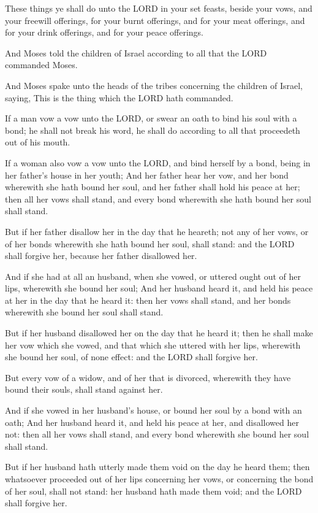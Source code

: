 \Verse These things ye shall do unto the LORD in your set feasts,
beside your vows, and your freewill offerings, for your burnt
offerings, and for your meat offerings, and for your drink offerings,
and for your peace offerings.

\Verse And Moses told the children of Israel according to all that the
LORD commanded Moses.


\Chapter
\Verse And Moses spake unto the heads of the tribes concerning the
children of Israel, saying, This is the thing which the LORD hath
commanded.

\Verse If a man vow a vow unto the LORD, or swear an oath to bind his
soul with a bond; he shall not break his word, he shall do according
to all that proceedeth out of his mouth.

\Verse If a woman also vow a vow unto the LORD, and bind herself by a
bond, being in her father's house in her youth; \Verse And her father
hear her vow, and her bond wherewith she hath bound her soul, and her
father shall hold his peace at her; then all her vows shall stand, and
every bond wherewith she hath bound her soul shall stand.

\Verse But if her father disallow her in the day that he heareth; not
any of her vows, or of her bonds wherewith she hath bound her soul,
shall stand: and the LORD shall forgive her, because her father
disallowed her.

\Verse And if she had at all an husband, when she vowed, or uttered
ought out of her lips, wherewith she bound her soul; \Verse And her
husband heard it, and held his peace at her in the day that he heard
it: then her vows shall stand, and her bonds wherewith she bound her
soul shall stand.

\Verse But if her husband disallowed her on the day that he heard it;
then he shall make her vow which she vowed, and that which she uttered
with her lips, wherewith she bound her soul, of none effect: and the
LORD shall forgive her.

\Verse But every vow of a widow, and of her that is divorced, wherewith
they have bound their souls, shall stand against her.

\Verse And if she vowed in her husband's house, or bound her soul by a
bond with an oath; \Verse And her husband heard it, and held his peace
at her, and disallowed her not: then all her vows shall stand, and
every bond wherewith she bound her soul shall stand.

\Verse But if her husband hath utterly made them void on the day he
heard them; then whatsoever proceeded out of her lips concerning her
vows, or concerning the bond of her soul, shall not stand: her husband
hath made them void; and the LORD shall forgive her.

